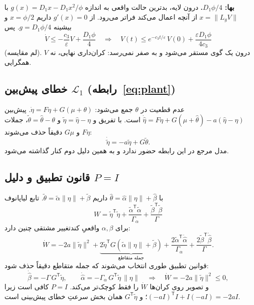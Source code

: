 \documentclass[10pt,twocolumn]{article}
\newcommand{\en}[1]{\lr{#1}}
\begin{document}
\textbf{بها: $D_1\phi/4$.} درون لایه، بدترین حالت واقعی به اندازه
$g(x)=D_1x-D_1x^2/\phi$ با $x=\|L_gV\|$ از آنچه \en{QP} اعمال می‌کند فراتر می‌رود.
از $g'(x)=0$ داریم $x=\phi/2$ و بیشینه $g=D_1\phi/4$. پس
\begin{equation*}
    \dot V\le-\frac{c_3}{\varepsilon}V+\frac{D_1\phi}{4}
    \quad\Rightarrow\quad
    V(t)\le e^{-c_3t/\varepsilon}\,V(0)+\frac{\varepsilon D_1\phi}{4c_3}
\end{equation*}
(لم مقایسه). $V$ درون یک گوی مستقر می‌شود و به صفر نمی‌رسد: کران‌داری نهایی، نه همگرایی.

\subsection{خطای پیش‌بین $\mathcal{L}_1$ (رابطه~\eqref{eq:plant})}
عدم قطعیت در $\theta$ جمع می‌شود: $\dot\eta=F\eta+G(\mu+\theta)$. پیش‌بین
$\dot{\hat\eta}=F\eta+G(\mu+\hat\theta)-a(\hat\eta-\eta)$ است. با تفریق و
$\tilde\eta=\hat\eta-\eta$ و $\tilde\theta=\hat\theta-\theta$، جملات $F\eta$ و $G\mu$
دقیقاً حذف می‌شوند:
\begin{equation*}
    \dot{\tilde\eta}=-a\tilde\eta+G\tilde\theta .
\end{equation*}
مدل مرجع در این رابطه حضور ندارد و به همین دلیل \en{QP} دوم کنار گذاشته می‌شود.

\subsection{قانون تطبیق و دلیل $P=I$}
با $\hat\theta=\hat\alpha\|\eta\|+\hat\beta$ داریم $\tilde\theta=\tilde\alpha\|\eta\|+\tilde\beta$.
تابع لیاپانوف
\begin{equation*}
    W=\tilde\eta^{\mathsf T}\tilde\eta+\frac{\tilde\alpha^{\mathsf T}\tilde\alpha}{\Gamma_\alpha}
    +\frac{\tilde\beta^{\mathsf T}\tilde\beta}{\Gamma}
\end{equation*}
برای $\alpha,\beta$ واقعیِ کندتغییر مشتقی چنین دارد:
\begin{equation*}
    \dot W=-2a\|\tilde\eta\|^2
    +\underbrace{2\tilde\eta^{\mathsf T}G(\tilde\alpha\|\eta\|+\tilde\beta)}_{\text{جمله متقاطع}}
    +\frac{2\tilde\alpha^{\mathsf T}\dot{\hat\alpha}}{\Gamma_\alpha}
    +\frac{2\tilde\beta^{\mathsf T}\dot{\hat\beta}}{\Gamma}.
\end{equation*}
قوانین تطبیق طوری انتخاب می‌شوند که جمله متقاطع دقیقاً حذف شود:
\begin{equation*}
    \dot{\hat\beta}=-\Gamma\,G^{\mathsf T}\tilde\eta,\qquad
    \dot{\hat\alpha}=-\Gamma_\alpha\,G^{\mathsf T}\tilde\eta\,\|\eta\|
    \quad\Rightarrow\quad \dot W=-2a\|\tilde\eta\|^2\le0 ,
\end{equation*}
و تصویر روی کران‌ها $\dot W$ را فقط کوچک‌تر می‌کند. $P=I$ کافی است زیرا
$(-aI)^{\mathsf T}I+I(-aI)=-2aI$؛ و $G^{\mathsf T}\tilde\eta$ همان بخش سرعتِ خطای پیش‌بینی است.
\end{document}

